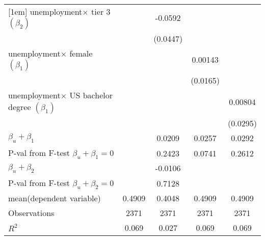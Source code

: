 \begin{table}[htbp]
\begin{adjustbox}{max width=0.5\textwidth}
\begin{tabular}{l*{4}{c}}
[1em]
unemployment$\times$ tier 3  $\left( \beta_2 \right)$&                     &     -0.0592         &                     &                                          \\
            &                     &    (0.0447)         &                     &                                          \\
[1em]
unemployment$\times$ female $\left( \beta_1 \right)$&                     &                     &                         0.00143         &                     \\
            &                     &                     &                         (0.0165)         &                     \\
[1em]
unemployment$\times$ US bachelor degree $\left( \beta_1 \right)$&                                         &                     &                     &     0.00804         \\
            &                     &                     &                     &                         (0.0295)         \\
\hline
$\beta_u + \beta_1$ &                 &        0.0209         &        0.0257         &       0.0292         \\
P-val from F-test $\beta_u + \beta_1=0$&                 &        0.2423             &   0.0741         &       0.2612         \\
$\beta_u + \beta_2$ &                 &        -0.0106         &       &                          \\
P-val from F-test $\beta_u + \beta_2=0$&                 &        0.7128         &       &                          \\
\hline
mean(dependent variable)  &        0.4909         &        0.4048         &                   0.4909         &         0.4909         \\
\hline
Observations       &        2371         &        2371                          &        2371         &        2371         \\
\(R^{2}\)   &       0.069         &       0.027               &       0.069         &       0.069         \\

\end{tabular}
\end{adjustbox}
\end{table}
